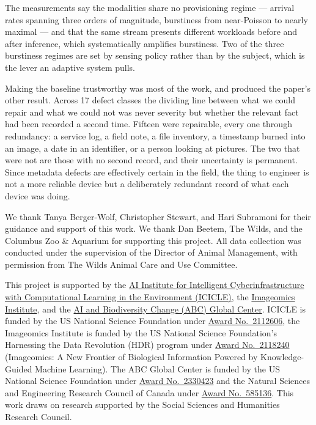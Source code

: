 \documentclass[sigconf]{acmart}
\begin{document}
The measurements say the modalities share no provisioning regime ---
arrival rates spanning three orders of magnitude, burstiness from
near-Poisson to nearly maximal --- and that the same stream presents
different workloads before and after inference, which systematically
amplifies burstiness. Two of the three burstiness regimes are set by
sensing policy rather than by the subject, which is the lever an
adaptive system pulls.

Making the baseline trustworthy was most of the work, and produced the
paper's other result. Across 17 defect classes the dividing line between
what we could repair and what we could not was never severity but
whether the relevant fact had been recorded a second time. Fifteen were
repairable, every one through redundancy: a service log, a field note, a
file inventory, a timestamp burned into an image, a date in an
identifier, or a person looking at pictures. The two that were not are
those with no second record, and their uncertainty is permanent. Since
metadata defects are effectively certain in the field, the thing to
engineer is not a more reliable device but a deliberately redundant
record of what each device was doing.

\begin{acks}
We thank Tanya Berger-Wolf, Christopher Stewart, and Hari Subramoni for
their guidance and support of this work. We thank Dan Beetem, The Wilds, and the Columbus Zoo \& Aquarium for
supporting this project. All data collection was conducted under the
supervision of the Director of Animal Management, with permission from
The Wilds Animal Care and Use Committee.

This project is supported by the \href{https://icicle.osu.edu/}{AI
Institute for Intelligent Cyberinfrastructure with Computational
Learning in the Environment (ICICLE)}, the
\href{https://imageomics.org/}{Imageomics Institute}, and the
\href{http://abcresearchcenter.org/}{AI and Biodiversity Change (ABC)
Global Center}. ICICLE is funded by the US National Science Foundation
under
\href{https://www.nsf.gov/awardsearch/showAward?AWD_ID=2112606}{Award
No.\ 2112606}, the Imageomics Institute is funded by the US National
Science Foundation's Harnessing the Data Revolution (HDR) program under
\href{https://www.nsf.gov/awardsearch/showAward?AWD_ID=2118240}{Award
No.\ 2118240} (Imageomics: A New Frontier of Biological Information
Powered by Knowledge-Guided Machine Learning). The ABC Global Center is
funded by the US National Science Foundation under
\href{https://www.nsf.gov/awardsearch/showAward?AWD_ID=2330423&HistoricalAwards=false}{Award
No.\ 2330423} and the Natural Sciences and Engineering Research Council
of Canada under
\href{https://www.nserc-crsng.gc.ca/ase-oro/Details-Detailles_eng.asp?id=782440}{Award
No.\ 585136}. This work draws on research supported by the Social
Sciences and Humanities Research Council.
\end{acks}
\end{document}
